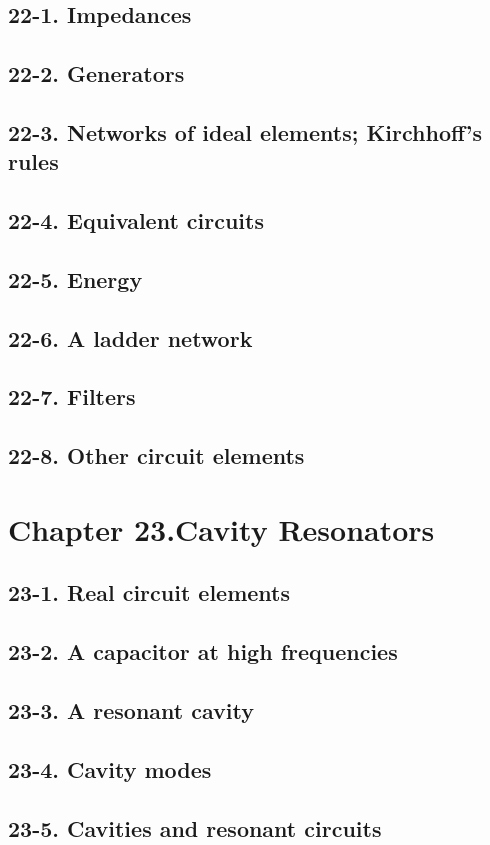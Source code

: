 \documentclass{article}
\begin{document}
\subsection{22-1. Impedances}
\subsection{22-2. Generators}
\subsection{22-3. Networks of ideal elements; Kirchhoff’s rules}
\subsection{22-4. Equivalent circuits}
\subsection{22-5. Energy}
\subsection{22-6. A ladder network}
\subsection{22-7. Filters}
\subsection{22-8. Other circuit elements}
\section{Chapter 23.Cavity Resonators}
\subsection{23-1. Real circuit elements}
\subsection{23-2. A capacitor at high frequencies}
\subsection{23-3. A resonant cavity}
\subsection{23-4. Cavity modes}
\subsection{23-5. Cavities and resonant circuits}
\end{document}
